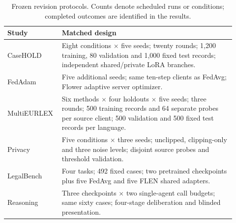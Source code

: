 \begin{table}[t]
\caption{Frozen revision protocols. Counts denote scheduled runs or conditions; completed outcomes are identified in the results.}
\label{tab:revision-protocol}
\centering
\small
\begin{tabular}{@{}p{0.19\linewidth}p{0.73\linewidth}@{}}
\toprule
Study & Matched design \\
\midrule
CaseHOLD & Eight conditions $\times$ five seeds; twenty rounds; 1,200 training, 80 validation and 1,000 fixed test records; independent shared/private LoRA branches. \\
FedAdam & Five additional seeds; same ten-step clients as FedAvg; Flower adaptive server optimizer. \\
MultiEURLEX & Six methods $\times$ four holdouts $\times$ five seeds; three rounds; 500 training records and 64 separate probes per source client; 500 validation and 500 fixed test records per language. \\
Privacy & Five conditions $\times$ three seeds; unclipped, clipping-only and three noise levels; disjoint source probes and threshold validation. \\
LegalBench & Four tasks; 492 fixed cases; two pretrained checkpoints plus five FedAvg and five FLEN shared adapters. \\
Reasoning & Three checkpoints $\times$ two single-agent call budgets; same sixty cases; four-stage deliberation and blinded presentation. \\
\bottomrule
\end{tabular}
\end{table}
